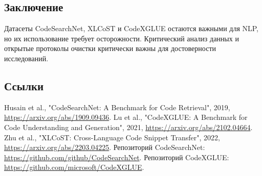 \subsection{Заключение}

Датасеты CodeSearchNet, XLCoST и CodeXGLUE остаются важными для NLP, но их использование требует осторожности. Критический анализ данных и открытые протоколы очистки критически важны для достоверности исследований.

\subsection{Ссылки}
\begin{thebibliography}{9}
 Husain et al., "CodeSearchNet: A Benchmark for Code Retrieval", 2019, \url{https://arxiv.org/abs/1909.09436}.
 Lu et al., "CodeXGLUE: A Benchmark for Code Understanding and Generation", 2021, \url{https://arxiv.org/abs/2102.04664}.
 Zhu et al., "XLCoST: Cross-Language Code Snippet Transfer", 2022, \url{https://arxiv.org/abs/2203.04225}.
 Репозиторий CodeSearchNet: \url{https://github.com/github/CodeSearchNet}.
 Репозиторий CodeXGLUE: \url{https://github.com/microsoft/CodeXGLUE}.
\end{thebibliography}